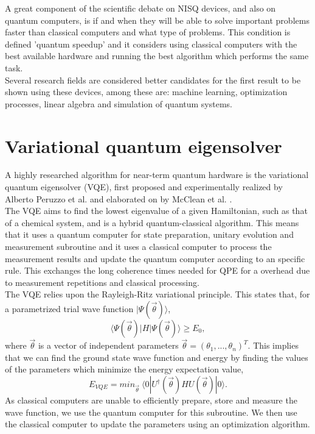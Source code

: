 A great component of the scientific debate on NISQ devices, and also on quantum computers, is if and when they will be able to solve important problems faster than classical computers and what type of problems. This condition is defined 'quantum speedup' and it considers using classical computers with the best available hardware and running the best algorithm which performs the same task. \\
Several research fields are considered better candidates for the first result to be shown using these devices, among these are: machine learning, optimization processes, linear algebra and simulation of quantum systems.

\section{Variational quantum eigensolver}
A highly researched algorithm for near-term quantum hardware is the variational quantum eigensolver (VQE), first proposed and experimentally realized by Alberto Peruzzo et al. \cite{Peruzzo2014Jul} and elaborated on by McClean et al. \cite{McClean2016Feb}. \\
The VQE aims to find the lowest eigenvalue of a given Hamiltonian, such as that of a chemical system, and is a hybrid quantum-classical algorithm. This means that it uses a quantum computer for state preparation, unitary evolution and measurement subroutine and it uses a classical computer to process the measurement results and update the quantum computer according to an specific rule. This exchanges the long coherence times needed for QPE for a overhead due to measurement repetitions and classical processing. \\
The VQE relies upon the Rayleigh-Ritz variational principle. This states that, for a parametrized trial wave function $|\Psi(\vec{\theta})\rangle$,
\begin{equation}
    \langle\Psi(\vec{\theta})|H|\Psi(\vec{\theta})\rangle \geq E_0,
\end{equation}
where $\vec{\theta}$ is a vector of independent parameters $\vec{\theta} = (\theta_1, ..., \theta_n)^T$. This implies that we can find the ground state wave function and energy by finding the values of the parameters which minimize the energy expectation value,
\begin{equation}
    E_{VQE} = min_{\vec{\theta}} \ \langle0| U^{\dagger}(\vec{\theta}) H U(\vec{\theta}) |0\rangle.
\end{equation}
As classical computers are unable to efficiently prepare, store and measure the wave function, we use the quantum computer for this subroutine. We then use the classical computer to update the parameters using an optimization algorithm. \\
